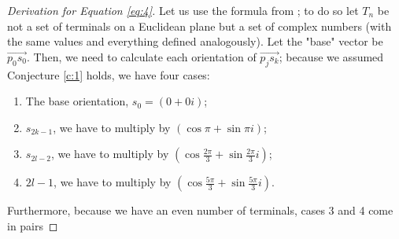 \documentclass{mpaper}
\begin{document}
\begin{proof}[Derivation for Equation \ref{eq:4}]
  Let us use the formula from \cite{uteshev2021length}; to do so let $T_n$ be not a set of terminals on a Euclidean plane but a set of complex numbers (with the same values and everything defined analogously). Let the "base" vector be $\overrightarrow{p_0s_0}$. Then, we need to calculate each orientation of $\overrightarrow{p_js_k}$; because we assumed Conjecture \ref{c:1} holds, we have four cases:
  \begin{enumerate}
    \item The base orientation, $s_0=(0+0i)$;
    \item $s_{2k-1}$, we have to multiply by $(\cos{\pi}+\sin{\pi}i)$;
    \item $s_{2l-2}$, we have to multiply by $(\cos{\frac{2\pi}{3}}+\sin{\frac{2\pi}{3}}i)$;
    \item ${2l-1}$, we have to multiply by $(\cos{\frac{5\pi}{3}}+\sin{\frac{5\pi}{3}}i)$.
  \end{enumerate}
  Furthermore, because we have an even number of terminals, cases 3 and 4 come in pairs
\end{proof}
\end{document}
